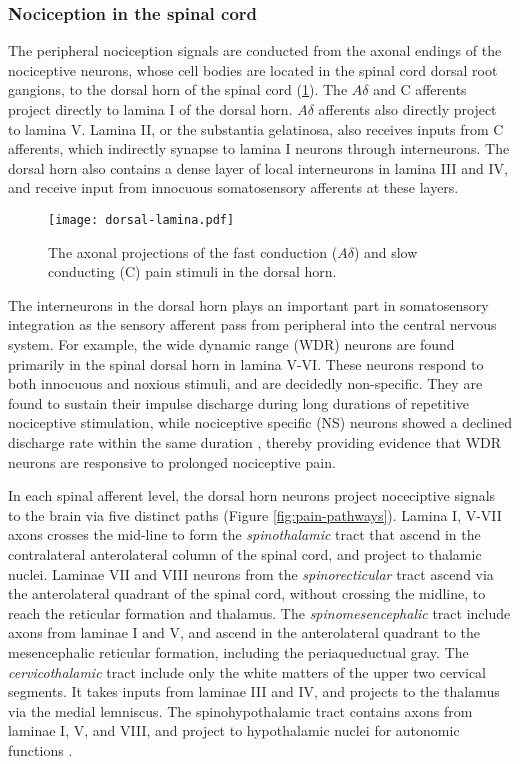 \subsubsection{Nociception in the spinal cord}

The peripheral nociception signals are conducted from the axonal endings of the nociceptive neurons, whose cell bodies are located in the spinal cord dorsal root gangions, to the dorsal horn of the spinal cord (\ref{fig:drg}). The $A\delta$ and C afferents project directly to lamina I of the dorsal horn. $A\delta$ afferents also directly project to lamina V. Lamina II, or the substantia gelatinosa, also receives inputs from C afferents, which indirectly synapse to lamina I neurons through interneurons. The dorsal horn also contains a dense layer of local interneurons in lamina III and IV, and receive input from innocuous somatosensory afferents at these layers. 

\begin{figure}[ht]
\texttt{[image: dorsal-lamina.pdf]}
\centering
\caption{The axonal projections of the fast conduction ($ A\delta$) and slow conducting (C) pain stimuli in the dorsal horn.}
\label{fig:drg}
\end{figure}
 
The interneurons in the dorsal horn plays an important part in somatosensory integration as the sensory afferent pass from peripheral into the central nervous system. For example, the wide dynamic range (WDR) neurons are found primarily in the spinal dorsal horn in lamina V-VI. These neurons respond to both innocuous and noxious stimuli, and are decidedly non-specific. They are found to sustain their impulse discharge during long durations of repetitive nociceptive stimulation, while nociceptive specific (NS) neurons showed a declined discharge rate within the same duration \cite{Coghill1993,Maixner1986}, thereby providing evidence that WDR neurons are responsive to prolonged nociceptive pain. 

In each spinal afferent level, the dorsal horn neurons project noceciptive signals to the brain via five distinct paths (Figure \ref{fig:pain-pathways}). Lamina I, V-VII axons crosses the mid-line to form the \textit{spinothalamic} tract that ascend in the contralateral anterolateral column of the spinal cord, and project to thalamic nuclei. Laminae VII and VIII neurons from the \textit{spinorecticular} tract ascend via the anterolateral quadrant of the spinal cord, without crossing the midline, to reach the reticular formation and thalamus. The \textit{spinomesencephalic} tract include axons from laminae I and V, and ascend in the anterolateral quadrant to the mesencephalic reticular formation, including the periaqueductual gray. The \textit{cervicothalamic} tract include only the white matters of the upper two cervical segments. It takes inputs from laminae III and IV, and projects to the thalamus via the medial lemniscus. The spinohypothalamic tract contains axons from laminae I, V, and VIII, and project to hypothalamic nuclei for autonomic functions \cite{kandel2000principles}. 

